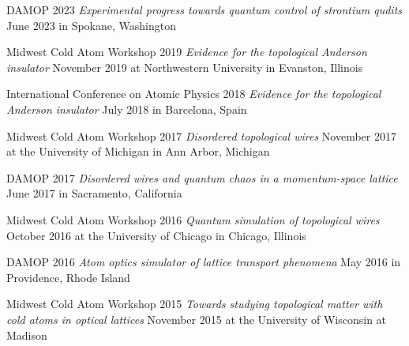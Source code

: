 \documentclass[12pt,letterpaper,sans]{moderncv}
\begin{document}
\begin{etaremune}[topsep=0pt,itemsep=4pt,partopsep=0pt,parsep=0pt]

\item DAMOP 2023
\newline
\emph{Experimental progress towards quantum control of strontium qudits}
\newline
June 2023 in Spokane, Washington

\item Midwest Cold Atom Workshop 2019
\newline
\emph{Evidence for the topological Anderson insulator}
\newline
November 2019 at Northwestern University in Evanston, Illinois

\item International Conference on Atomic Physics 2018
\newline
\emph{Evidence for the topological Anderson insulator}
\newline
July 2018 in Barcelona, Spain

\item Midwest Cold Atom Workshop 2017
\newline
\emph{Disordered topological wires}
\newline
November 2017 at the University of Michigan in Ann Arbor, Michigan

\item DAMOP 2017
\newline
\emph{Disordered wires and quantum chaos in a momentum-space lattice}
\newline
June 2017 in Sacramento, California

\item Midwest Cold Atom Workshop 2016
\newline
\emph{Quantum simulation of topological wires}
\newline
October 2016 at the University of Chicago in Chicago, Illinois

\item DAMOP 2016
\newline
\emph{Atom optics simulator of lattice transport phenomena}
\newline
May 2016 in Providence, Rhode Island

\item Midwest Cold Atom Workshop 2015
\newline
\emph{Towards studying topological matter with cold atoms in optical lattices}
\newline
November 2015 at the University of Wisconsin at Madison

\end{etaremune}
\end{document}
